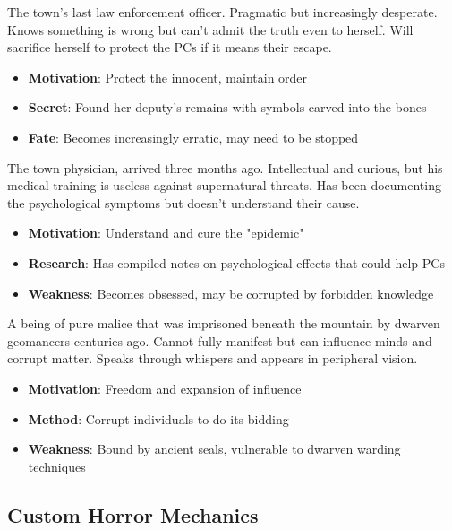 \documentclass[11pt]{article}
\begin{document}
\begin{description}[leftmargin=*]
\item[Marshal Elena Vasquez] The town's last law enforcement officer. Pragmatic but increasingly desperate. Knows something is wrong but can't admit the truth even to herself. Will sacrifice herself to protect the PCs if it means their escape.
\begin{itemize}
\item \textbf{Motivation}: Protect the innocent, maintain order
\item \textbf{Secret}: Found her deputy's remains with symbols carved into the bones
\item \textbf{Fate}: Becomes increasingly erratic, may need to be stopped
\end{itemize}

\item[Dr. Samuel Crowell] The town physician, arrived three months ago. Intellectual and curious, but his medical training is useless against supernatural threats. Has been documenting the psychological symptoms but doesn't understand their cause.
\begin{itemize}
\item \textbf{Motivation}: Understand and cure the "epidemic"
\item \textbf{Research}: Has compiled notes on psychological effects that could help PCs
\item \textbf{Weakness}: Becomes obsessed, may be corrupted by forbidden knowledge
\end{itemize}

\item[The Entity (Ancient in the Dark)] A being of pure malice that was imprisoned beneath the mountain by dwarven geomancers centuries ago. Cannot fully manifest but can influence minds and corrupt matter. Speaks through whispers and appears in peripheral vision.
\begin{itemize}
\item \textbf{Motivation}: Freedom and expansion of influence
\item \textbf{Method}: Corrupt individuals to do its bidding
\item \textbf{Weakness}: Bound by ancient seals, vulnerable to dwarven warding techniques
\end{itemize}
\end{description}

\subsection*{Custom Horror Mechanics}
\end{document}
